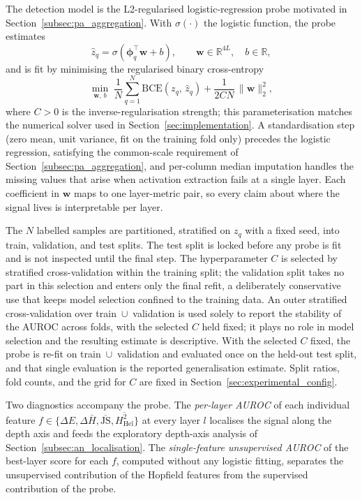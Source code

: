 The detection model is the L2-regularised logistic-regression probe
motivated in Section~\ref{subsec:pa_aggregation}. With $\sigma(\cdot)$ the
logistic function, the probe estimates
\begin{equation}
    \hat{z}_q
    =
    \sigma\!\left(\boldsymbol{\phi}_q^{\!\top}\boldsymbol{w} + b\right),
    \qquad
    \boldsymbol{w} \in \mathbb{R}^{4L},\quad b \in \mathbb{R},
    \label{eq:logistic_probe}
\end{equation}
and is fit by minimising the regularised binary cross-entropy
\begin{equation}
    \min_{\boldsymbol{w},\,b}\;
    \frac{1}{N}\sum_{q=1}^{N}
    \mathrm{BCE}\!\left(z_q,\,\hat{z}_q\right)
    +
    \frac{1}{2C N}\,\|\boldsymbol{w}\|_2^2,
    \label{eq:logistic_objective}
\end{equation}
where $C > 0$ is the inverse-regularisation strength; this parameterisation
matches the numerical solver used in
Section~\ref{sec:implementation}. A standardisation step (zero mean, unit
variance, fit on the training fold only) precedes the logistic regression,
satisfying the common-scale requirement of
Section~\ref{subsec:pa_aggregation}, and per-column median imputation
handles the missing values that arise when activation extraction fails at a
single layer. Each coefficient in $\boldsymbol{w}$ maps to one layer-metric
pair, so every claim about where the signal lives is interpretable per
layer.

The $N$ labelled samples are partitioned, stratified on $z_q$ with a fixed
seed, into train, validation, and test splits. The test split is locked
before any probe is fit and is not inspected until the final step. The
hyperparameter $C$ is selected by stratified cross-validation within the
training split; the validation split takes no part in this selection and
enters only the final refit, a deliberately conservative use that keeps
model selection confined to the training data. An outer stratified
cross-validation over train~$\cup$~validation is used solely to report the
stability of the AUROC across folds, with the selected $C$ held fixed; it
plays no role in model selection and the resulting estimate is descriptive.
With the selected $C$ fixed, the probe is re-fit on
train~$\cup$~validation and evaluated once on the held-out test split, and
that single evaluation is the reported generalisation estimate. Split
ratios, fold counts, and the grid for $C$ are fixed in
Section~\ref{sec:experimental_config}.

Two diagnostics accompany the probe. The \emph{per-layer AUROC} of each
individual feature
$f \in \{\Delta E, \Delta\bar{H}, \overline{\mathrm{JS}},
\overline{H^2_{\mathrm{Hel}}}\}$ at every layer $l$ localises the signal
along the depth axis and feeds the exploratory depth-axis analysis of
Section~\ref{subsec:an_localisation}. The
\emph{single-feature unsupervised AUROC} of the best-layer score for each
$f$, computed without any logistic fitting, separates the unsupervised
contribution of the Hopfield features from the supervised contribution of
the probe.

